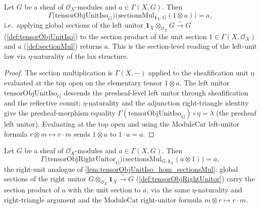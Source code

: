 \begin{lemma}

  \label{lem:tensorObjUnitIso_hom_sectionsMul}
  Let \(G\) be a sheaf of \(\mathcal{O}_X\)-modules and \(a \in \Gamma(X, G)\).
  Then
  \[
    \Gamma\bigl(\mathrm{tensorObjUnitIso}_G\bigr)
      \bigl(\mathrm{sectionsMul}_{\mathbf{1}_X, G}(1 \otimes a)\bigr) = a,
  \]
  i.e.\ applying global sections of the left unitor
  \(\mathbf{1}_X \otimes_{\mathcal{O}_X} G \xrightarrow{\sim} G\)
  (\cref{def:tensorObjUnitIso}) to the section product of the unit section
  \(1 \in \Gamma(X,\mathcal{O}_X)\) and \(a\) (\cref{def:sectionMul}) returns
  \(a\). This is the section-level reading of the left-unit law via
  \(\eta\)-naturality of the lax structure.
\end{lemma}

\begin{proof}
  \leanok
  The section multiplication is \(\Gamma(X,-)\) applied to the sheafification unit
  \(\eta\) evaluated at the top open on the elementary tensor \(1 \otimes a\). The
  left unitor \(\mathrm{tensorObjUnitIso}_G\) descends the presheaf-level left
  unitor through sheafification and the reflective counit; \(\eta\)-naturality and
  the adjunction right-triangle identity give the presheaf-morphism equality
  \(\Gamma(\mathrm{tensorObjUnitIso}_G) \circ \eta = \lambda\) (the presheaf left
  unitor). Evaluating at the top open and using the \(\mathrm{ModuleCat}\)
  left-unitor formula \(r \otimes m \mapsto r \cdot m\) sends \(1 \otimes a\) to
  \(1 \cdot a = a\).
\end{proof}

\begin{lemma}

  \label{lem:tensorObjRightUnitor_hom_sectionsMul}
  Let \(G\) be a sheaf of \(\mathcal{O}_X\)-modules and \(a \in \Gamma(X, G)\).
  Then
  \[
    \Gamma\bigl(\mathrm{tensorObjRightUnitor}_G\bigr)
      \bigl(\mathrm{sectionsMul}_{G, \mathbf{1}_X}(a \otimes 1)\bigr) = a,
  \]
  the right-unit analogue of \cref{lem:tensorObjUnitIso_hom_sectionsMul}: global
  sections of the right unitor
  \(G \otimes_{\mathcal{O}_X} \mathbf{1}_X \xrightarrow{\sim} G\)
  (\cref{def:tensorObjRightUnitor}) carry the section product of \(a\) with the
  unit section to \(a\), via the same \(\eta\)-naturality and right-triangle
  argument and the \(\mathrm{ModuleCat}\) right-unitor formula
  \(m \otimes r \mapsto r \cdot m\).
\end{lemma}


